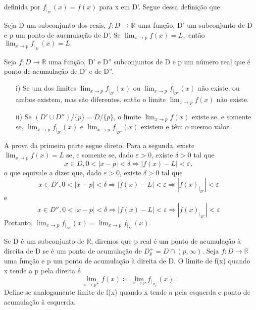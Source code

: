 \documentclass[Analysis/analysis_notes.tex]{subfiles}
\begin{document}
definida por $f_{|_{D'}}(x) = f(x)$ para x em D'. Segue dessa defini\c c\~ao que
\begin{theorem*}
	Seja D um subconjunto dos reais, $f:D\rightarrow \mathbb{R}$ uma fun\c c\~ao, D' um subconjunto de D e p um ponto de aucmula\c c\~ao de D'.
	Se $\lim_{x\to p}f(x) = L,$ ent\~ao $\lim_{x\to p}f_{|_{D'}}(x) = L.$
\end{theorem*}
\begin{theorem*}
	Seja $f:D\rightarrow \mathbb{R}$ uma fun\c c\~ao, D' e D'' subconjuntos de D e p um n\'umero real que \'e ponto de acumula\c c\~ao
	de D' e de D''.
	\begin{itemize}
		\item[i)] Se um dos limites $\lim_{x\to p}f_{|_{D'}}(x)$ ou $\lim_{x\to p}f_{|_{D''}}(x)$ n\~ao existe, ou ambos existem,
		      mas s\~ao diferentes, ent\~ao o limite $\lim_{x\to p}f(x)$ n\~ao existe.
		\item[ii)] Se $(D'\cup D'')/\{p\} = D/\{p\}$, o limite $\lim_{x\to p}f(x)$ existe se, e somente se, $\lim_{x\to p}f_{|_{D'}}(x)$ e
		      $\lim_{x\to p}f_{|_{D''}}(x)$ existem e t\^em o mesmo valor.
	\end{itemize}
\end{theorem*}
\begin{proof*}
	A prova da primeira parte segue direto. Para a segunda, existe $\lim_{x\to p }f(x) = L$ se, e somente se, dado $\varepsilon > 0$,
	existe $\delta > 0$ tal que
	$$
		x\in D, 0 < |x-p| < \delta \Rightarrow |f(x)-L| < \varepsilon,
	$$
	o que equivale a dizer que, dado $\varepsilon > 0$, existe $\delta > 0$ tal que
	$$
		x\in D', 0 < |x-p| < \delta \Rightarrow |f(x) - L|< \varepsilon \Rightarrow |f(x)_{|_{D'}}|<\varepsilon
	$$
	e
	$$
		x\in D'', 0 < |x-p| < \delta \Rightarrow |f(x) - L|< \varepsilon \Rightarrow |f(x)_{|_{D''}}|<\varepsilon
	$$
	Portanto, $\lim_{x\to p}f_{|_{D''}}(x) = \lim_{x\to p}f_{|_{D'}}(x)$. \qedsymbol
\end{proof*}
\begin{def*}
	Se D \'e um subconjunto de $\mathbb{R}$, diremos que p real \'e um ponto de acumula\c c\~ao \`a direita de D se \'e um ponto
	de acumula\c c\~ao de $D_{p}^{+} = D\cap{(p, \infty)}$. Seja $f:D\rightarrow \mathbb{R}$ uma fun\c c\~ao e p um ponto de
	acumula\c c\~ao \`a direita de D. O limite de f(x) quando x tende a p pela direita \'e
	$$
		\lim_{x\to p^{+}}f(x)\coloneqq \lim_{x\to p}f_{|_{D_{p}^{+}}}(x).
	$$
	Define-se analogamente limite de f(x) quando x tende a pela esquerda e ponto de acumula\c c\~ao \`a esquerda.
\end{def*}
\end{document}
